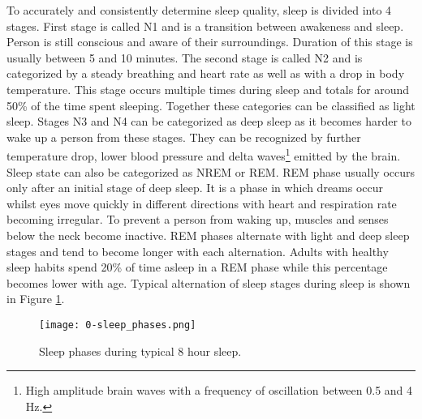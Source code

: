To accurately and consistently determine sleep quality, sleep is divided into 4 stages. First stage is called N1 and is a transition between awakeness and sleep. Person is still conscious and aware of their surroundings. Duration of this stage is usually between 5 and 10 minutes. The second stage is called N2 and is categorized by a steady breathing and heart rate as well as with a drop in body temperature. This stage occurs multiple times during sleep and totals for around 50\% of the time spent sleeping. Together these categories can be classified as light sleep. Stages N3 and N4 can be categorized as deep sleep as it becomes harder to wake up a person from these stages. They can be recognized by further temperature drop, lower blood pressure and delta waves\footnote{High amplitude brain waves with a frequency of oscillation between 0.5 and 4 Hz.} emitted by the brain. Sleep state can also be categorized as \ac{NREM} or \ac{REM}. REM phase usually occurs only after an initial stage of deep sleep. It is a phase in which dreams occur whilst eyes move quickly in different directions with heart and respiration rate becoming irregular. To prevent a person from waking up, muscles and senses below the neck become inactive. \ac{REM} phases alternate with light and deep sleep stages and tend to become longer with each alternation. Adults with healthy sleep habits spend 20\% of time asleep in a \ac{REM} phase while this percentage becomes lower with age. Typical alternation of sleep stages during sleep is shown in Figure \ref{fig:sleep-phases}. \\

\begin{figure}[h]
  \begin{center}
    \texttt{[image: 0-sleep\_phases.png]}
  \end{center}
  \caption{Sleep phases during typical 8 hour sleep.}
  \label{fig:sleep-phases}
\end{figure}

